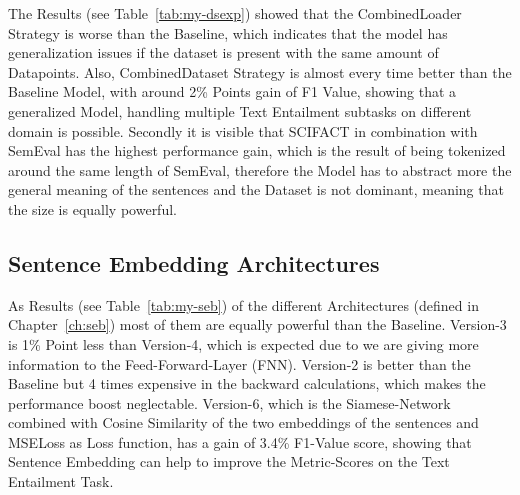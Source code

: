 The Results (see Table~\ref{tab:my-dsexp}) showed that the CombinedLoader Strategy is worse than the Baseline, 
which indicates that the model has generalization issues if the dataset is present
with the same amount of Datapoints. Also, CombinedDataset Strategy is almost every
time better than the Baseline Model, with around 2\% Points gain of F1 Value, showing
that a generalized Model, handling multiple Text Entailment subtasks on different domain 
is possible. Secondly it is visible that SCIFACT in combination with SemEval has the highest
performance gain, which is the result of being tokenized around the same length of SemEval, therefore
the Model has to abstract more the general meaning of the sentences and the Dataset is not dominant,
meaning that the size is equally powerful.














\subsection{Sentence Embedding Architectures}

As Results (see Table~\ref{tab:my-seb}) of the different Architectures (defined in Chapter~\ref{ch:seb})
most of them are equally powerful than the Baseline. Version-3 is 1\% Point less than Version-4, which 
is expected due to we are giving more information to the Feed-Forward-Layer (FNN). Version-2 is better than
the Baseline but 4 times expensive in the backward calculations, which makes the performance boost neglectable.
Version-6, which is the Siamese-Network combined with Cosine Similarity of the two embeddings of the sentences
and MSELoss as Loss function, has a gain of 3.4\% F1-Value score, showing that Sentence Embedding can
help to improve the Metric-Scores on the Text Entailment Task.


